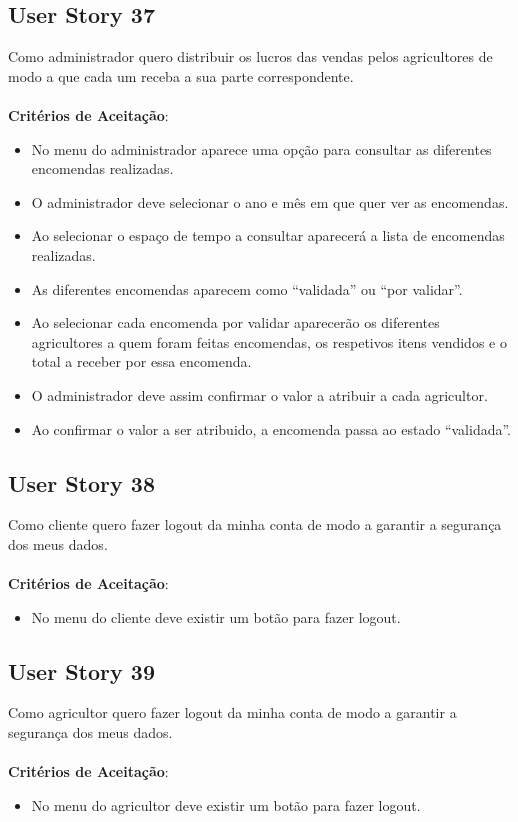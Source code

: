 \documentclass[a4paper,11pt]{article}
\begin{document}
\subsection{User Story 37}
Como administrador quero distribuir os lucros das vendas pelos agricultores de modo  a que cada um receba a sua parte correspondente.\\\\
\textbf{Critérios de Aceitação}:
\begin{itemize}
  \item No menu do administrador aparece uma opção para consultar as diferentes encomendas realizadas.
  \item O administrador deve selecionar o ano e mês em que quer ver as encomendas.
  \item Ao selecionar o espaço de tempo a consultar aparecerá a lista de encomendas realizadas.
  \item As diferentes encomendas aparecem como “validada” ou “por validar”.
  \item Ao selecionar cada encomenda por validar aparecerão os diferentes agricultores a quem foram feitas encomendas, os respetivos itens vendidos e o total a receber por essa encomenda.
  \item O administrador deve assim confirmar o valor a atribuir a cada agricultor.
  \item Ao confirmar o valor a ser atribuido, a encomenda passa ao estado “validada”.
\end{itemize}
\subsection{User Story 38}
Como cliente quero fazer logout da minha conta de modo a garantir a segurança dos meus dados.\\\\
\textbf{Critérios de Aceitação}:
\begin{itemize}
  \item No menu do cliente deve existir um botão para fazer logout.
\end{itemize}
\subsection{User Story 39}
Como agricultor quero fazer logout da minha conta de modo a garantir a segurança dos meus dados.\\\\
\textbf{Critérios de Aceitação}:
\begin{itemize}
  \item No menu do agricultor deve existir um botão para fazer logout.
\end{itemize}
\end{document}
